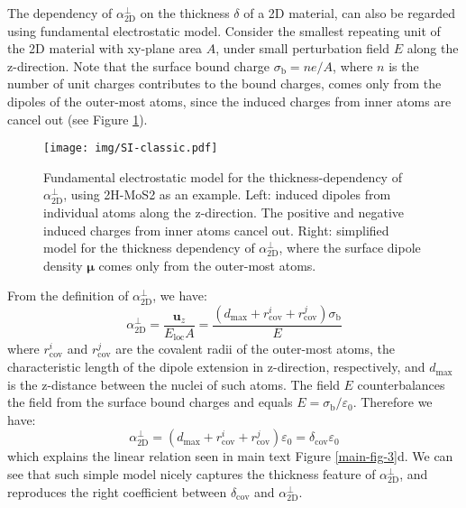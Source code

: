 \documentclass[journal=ancac3,email=true,hyperref=true,keywords=false]{achemso}
\begin{document}
The dependency of $\alpha_{\mathrm{2D}}^{\perp}$ on the thickness
$\delta$ of a 2D material, can also be regarded using fundamental
electrostatic model. Consider the smallest repeating unit of the 2D
material with xy-plane area $A$, under small perturbation field $E$
along the z-direction.  Note that the surface bound charge
$\sigma_{\mathrm{b}}=n e /A$, where $n$ is the number of unit charges
contributes to the bound charges, comes only from the dipoles of the
outer-most atoms, since the induced charges from inner atoms are
cancel out (see Figure \ref{fig:classic-model}).
\begin{figure}[htbp]
  \centering
  \texttt{[image: img/SI-classic.pdf]}
  \caption{Fundamental electrostatic model for the
    thickness-dependency of $\alpha_{\mathrm{2D}}^{\perp}$, using 2H-MoS2 as an
    example. Left: induced dipoles from individual atoms along the
    z-direction. The positive and negative induced charges from inner
    atoms cancel out. Right: simplified model for the thickness
    dependency of $\alpha_{\mathrm{2D}}^{\perp}$, where the surface dipole density
    $\boldsymbol{\mu}$ comes only from the outer-most atoms.}
  \label{fig:classic-model}
\end{figure}
From the definition of
$\alpha_{\mathrm{2D}}^{\perp}$, we have:
\begin{equation}
  \label{eq:alpha-classic}
  \alpha_{\mathrm{2D}}^{\perp} = \frac{\boldsymbol{u}_{z}}{E_{\mathrm{loc}} A}
  = \frac{(d_{\mathrm{max}} + r_{\mathrm{cov}}^{i} + r_{\mathrm{cov}}^{j}) \sigma_{\mathrm{b}}}{E}
\end{equation}
where $r_{\mathrm{cov}}^{i}$ and $r_{\mathrm{cov}}^{j}$ are the
covalent radii of the outer-most atoms, the characteristic length of
the dipole extension in z-direction, respectively, and $d_{\mathrm{max}}$ is the
z-distance between the nuclei of such atoms.  The field $E$
counterbalances the field from the surface bound charges and equals
$E = \sigma_{\mathrm{b}}/\varepsilon_{0}$. Therefore we have:
\begin{equation}
  \label{eq:alpha-classic-2}
  \alpha_{\mathrm{2D}}^{\perp} = (d_{\mathrm{max}} + r_{\mathrm{cov}}^{i} + r_{\mathrm{cov}}^{j})\varepsilon_{0}
                = \delta_{\mathrm{cov}} \varepsilon_{0}
\end{equation}
which explains the linear relation seen in main text Figure
\ref{main-fig-3}d. We can see that such simple model nicely captures
the thickness feature of $\alpha_{\mathrm{2D}}^{\perp}$, and
reproduces the right coefficient between $\delta_{\mathrm{cov}}$ and
$\alpha_{\mathrm{2D}}^{\perp}$.
\end{document}

